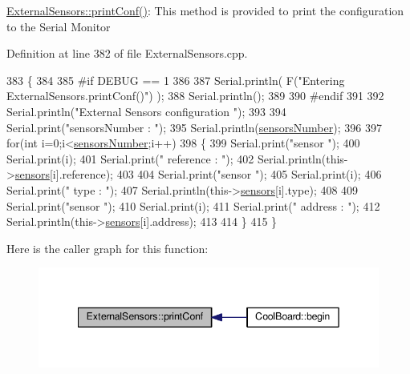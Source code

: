 \hyperlink{class_external_sensors_a78c2bf55084435dd51d3c559b2d3c6f3}{External\+Sensors\+::print\+Conf()}\+: This method is provided to print the configuration to the Serial Monitor 

Definition at line 382 of file External\+Sensors.\+cpp.


\begin{DoxyCode}
383 \{
384 
385 \textcolor{preprocessor}{#if DEBUG == 1}
386 
387     Serial.println( F(\textcolor{stringliteral}{"Entering ExternalSensors.printConf()"}) );
388     Serial.println();
389 
390 \textcolor{preprocessor}{#endif }
391 
392     Serial.println(\textcolor{stringliteral}{"External Sensors configuration "});
393 
394     Serial.print(\textcolor{stringliteral}{"sensorsNumber : "});
395     Serial.println(\hyperlink{class_external_sensors_a58e4fbf9adeae787d92be5fa33043b5d}{sensorsNumber});
396 
397     \textcolor{keywordflow}{for}(\textcolor{keywordtype}{int} i=0;i<\hyperlink{class_external_sensors_a58e4fbf9adeae787d92be5fa33043b5d}{sensorsNumber};i++)
398     \{
399         Serial.print(\textcolor{stringliteral}{"sensor "});
400         Serial.print(i);
401         Serial.print(\textcolor{stringliteral}{" reference : "});
402         Serial.println(this->\hyperlink{class_external_sensors_a284233f884fcf00154a44740cf1d9e1e}{sensors}[i].reference);
403 
404         Serial.print(\textcolor{stringliteral}{"sensor "});
405         Serial.print(i);
406         Serial.print(\textcolor{stringliteral}{" type : "});
407         Serial.println(this->\hyperlink{class_external_sensors_a284233f884fcf00154a44740cf1d9e1e}{sensors}[i].type);
408                 
409         Serial.print(\textcolor{stringliteral}{"sensor "});
410         Serial.print(i);
411         Serial.print(\textcolor{stringliteral}{" address : "});
412         Serial.println(this->\hyperlink{class_external_sensors_a284233f884fcf00154a44740cf1d9e1e}{sensors}[i].address);
413     
414     \}
415 \}
\end{DoxyCode}
Here is the caller graph for this function\+:\nopagebreak
\begin{figure}[H]
\begin{center}
\leavevmode
\includegraphics[width=342pt]{d1/d2f/class_external_sensors_a78c2bf55084435dd51d3c559b2d3c6f3_icgraph}
\end{center}
\end{figure}
\mbox{\label{class_external_sensors_a53177b81eca3be89508b5511ddcd00fc}} 

